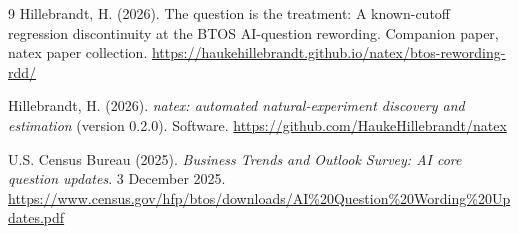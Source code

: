 \documentclass[11pt]{article}
\begin{document}
\begin{thebibliography}{9}
Hillebrandt, H. (2026).
The question is the treatment: A known-cutoff regression discontinuity at the
BTOS AI-question rewording.
Companion paper, natex paper collection.
\url{https://haukehillebrandt.github.io/natex/btos-rewording-rdd/}

Hillebrandt, H. (2026).
\emph{natex: automated natural-experiment discovery and estimation} (version
0.2.0). Software.
\url{https://github.com/HaukeHillebrandt/natex}

U.S. Census Bureau (2025).
\emph{Business Trends and Outlook Survey: AI core question updates}.
3 December 2025.
\url{https://www.census.gov/hfp/btos/downloads/AI\%20Question\%20Wording\%20Updates.pdf}

\end{thebibliography}
\end{document}
